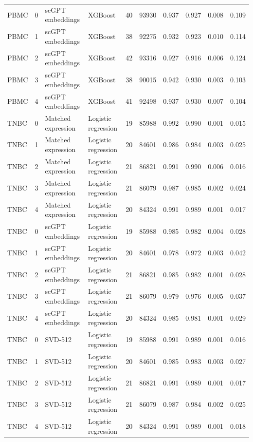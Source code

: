 {\begin{longtable}{lrllrrrrrr}
PBMC & 0 & scGPT embeddings & XGBoost & 40 & 93930 & 0.937 & 0.927 & 0.008 & 0.109 \\
PBMC & 1 & scGPT embeddings & XGBoost & 38 & 92275 & 0.932 & 0.923 & 0.010 & 0.114 \\
PBMC & 2 & scGPT embeddings & XGBoost & 42 & 93316 & 0.927 & 0.916 & 0.006 & 0.124 \\
PBMC & 3 & scGPT embeddings & XGBoost & 38 & 90015 & 0.942 & 0.930 & 0.003 & 0.103 \\
PBMC & 4 & scGPT embeddings & XGBoost & 41 & 92498 & 0.937 & 0.930 & 0.007 & 0.104 \\
TNBC & 0 & Matched expression & Logistic regression & 19 & 85988 & 0.992 & 0.990 & 0.001 & 0.015 \\
TNBC & 1 & Matched expression & Logistic regression & 20 & 84601 & 0.986 & 0.984 & 0.003 & 0.025 \\
TNBC & 2 & Matched expression & Logistic regression & 21 & 86821 & 0.991 & 0.990 & 0.006 & 0.016 \\
TNBC & 3 & Matched expression & Logistic regression & 21 & 86079 & 0.987 & 0.985 & 0.002 & 0.024 \\
TNBC & 4 & Matched expression & Logistic regression & 20 & 84324 & 0.991 & 0.989 & 0.001 & 0.017 \\
TNBC & 0 & scGPT embeddings & Logistic regression & 19 & 85988 & 0.985 & 0.982 & 0.004 & 0.028 \\
TNBC & 1 & scGPT embeddings & Logistic regression & 20 & 84601 & 0.978 & 0.972 & 0.003 & 0.042 \\
TNBC & 2 & scGPT embeddings & Logistic regression & 21 & 86821 & 0.985 & 0.982 & 0.001 & 0.028 \\
TNBC & 3 & scGPT embeddings & Logistic regression & 21 & 86079 & 0.979 & 0.976 & 0.005 & 0.037 \\
TNBC & 4 & scGPT embeddings & Logistic regression & 20 & 84324 & 0.985 & 0.981 & 0.001 & 0.029 \\
TNBC & 0 & SVD-512 & Logistic regression & 19 & 85988 & 0.991 & 0.989 & 0.001 & 0.016 \\
TNBC & 1 & SVD-512 & Logistic regression & 20 & 84601 & 0.985 & 0.983 & 0.003 & 0.027 \\
TNBC & 2 & SVD-512 & Logistic regression & 21 & 86821 & 0.991 & 0.989 & 0.001 & 0.017 \\
TNBC & 3 & SVD-512 & Logistic regression & 21 & 86079 & 0.987 & 0.984 & 0.002 & 0.025 \\
TNBC & 4 & SVD-512 & Logistic regression & 20 & 84324 & 0.991 & 0.989 & 0.001 & 0.018 \\

\end{longtable}}
